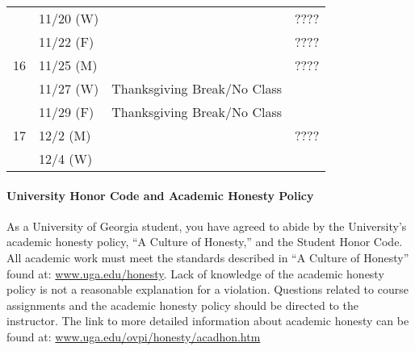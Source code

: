 \documentclass{article}
\begin{document}
\begin{longtable}{c l l l}
            & 11/20 (W)   &                                 & ????\\
            & 11/22 (F)   &                                 & ????\\
      16    & 11/25 (M)   &                                 & ????\\
            & 11/27 (W)   & Thanksgiving Break/No Class     & \\
            & 11/29 (F)   & Thanksgiving Break/No Class     & \\
      17    & 12/2 (M)    &                                 & ????\\
            & 12/4 (W)    &                                 &
    \end{longtable}

  \paragraph{University Honor Code and Academic Honesty Policy}
    As a University of Georgia student, you have agreed to abide by the University’s academic honesty policy, ``A Culture of Honesty,'' and the Student Honor Code. All academic work must meet the standards described in ``A Culture of Honesty'' found at: \url{www.uga.edu/honesty}. Lack of knowledge of the academic honesty policy is not a reasonable explanation for a violation. Questions related to course assignments and the academic honesty policy should be directed to the instructor. The link to more detailed information about academic honesty can be found at: \url{www.uga.edu/ovpi/honesty/acadhon.htm}
\end{document}
